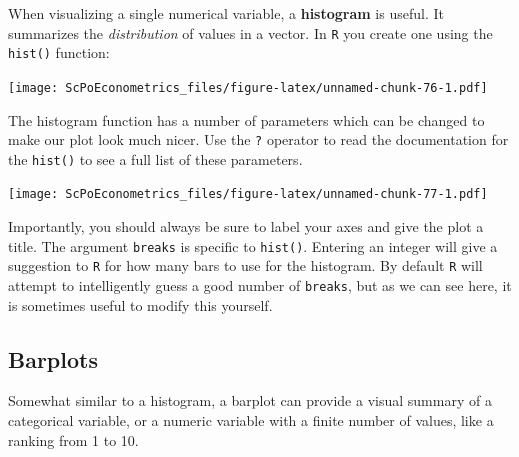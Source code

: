 \documentclass[]{book}
\newenvironment{Shaded}{\begin{snugshade}}{\end{snugshade}}
\newcommand{\KeywordTok}[1]{\textcolor[rgb]{0.13,0.29,0.53}{\textbf{#1}}}
\newcommand{\DataTypeTok}[1]{\textcolor[rgb]{0.13,0.29,0.53}{#1}}
\newcommand{\DecValTok}[1]{\textcolor[rgb]{0.00,0.00,0.81}{#1}}
\newcommand{\StringTok}[1]{\textcolor[rgb]{0.31,0.60,0.02}{#1}}
\newcommand{\CommentTok}[1]{\textcolor[rgb]{0.56,0.35,0.01}{\textit{#1}}}
\newcommand{\OperatorTok}[1]{\textcolor[rgb]{0.81,0.36,0.00}{\textbf{#1}}}
\newcommand{\NormalTok}[1]{#1}
\theoremstyle{definition}
\theoremstyle{definition}
\theoremstyle{definition}
\theoremstyle{remark}
\begin{document}
When visualizing a single numerical variable, a \textbf{histogram} is
useful. It summarizes the \emph{distribution} of values in a vector. In
\texttt{R} you create one using the \texttt{hist()} function:

\begin{Shaded}
\end{Shaded}

\texttt{[image: ScPoEconometrics\_files/figure-latex/unnamed-chunk-76-1.pdf]}

The histogram function has a number of parameters which can be changed
to make our plot look much nicer. Use the \texttt{?} operator to read
the documentation for the \texttt{hist()} to see a full list of these
parameters.

\begin{Shaded}
\end{Shaded}

\texttt{[image: ScPoEconometrics\_files/figure-latex/unnamed-chunk-77-1.pdf]}

Importantly, you should always be sure to label your axes and give the
plot a title. The argument \texttt{breaks} is specific to
\texttt{hist()}. Entering an integer will give a suggestion to
\texttt{R} for how many bars to use for the histogram. By default
\texttt{R} will attempt to intelligently guess a good number of
\texttt{breaks}, but as we can see here, it is sometimes useful to
modify this yourself.

\subsection{Barplots}\label{barplots}

Somewhat similar to a histogram, a barplot can provide a visual summary
of a categorical variable, or a numeric variable with a finite number of
values, like a ranking from 1 to 10.
\end{document}
